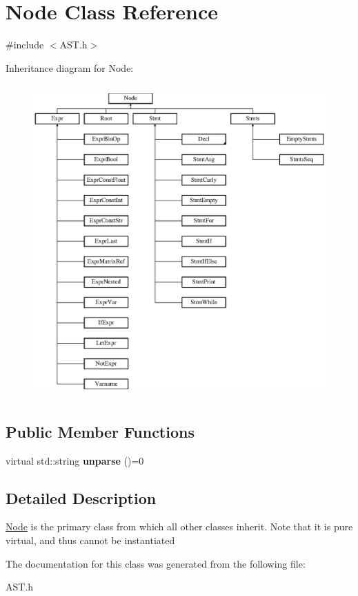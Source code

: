\hypertarget{classNode}{\section{Node Class Reference}
\label{classNode}
}


{\ttfamily \#include $<$A\-S\-T.\-h$>$}

Inheritance diagram for Node\-:\begin{figure}[H]
\begin{center}
\leavevmode
\includegraphics[height=12.000000cm]{classNode}
\end{center}
\end{figure}
\subsection*{Public Member Functions}
\begin{DoxyCompactItemize}
\item 
\hypertarget{classNode_a60ea533e0900961c05e701db70097136}{virtual std\-::string {\bfseries unparse} ()=0}\label{classNode_a60ea533e0900961c05e701db70097136}

\end{DoxyCompactItemize}


\subsection{Detailed Description}
\hyperlink{classNode}{Node} is the primary class from which all other classes inherit. Note that it is pure virtual, and thus cannot be instantiated 

The documentation for this class was generated from the following file\-:\begin{DoxyCompactItemize}
\item 
A\-S\-T.\-h\end{DoxyCompactItemize}
